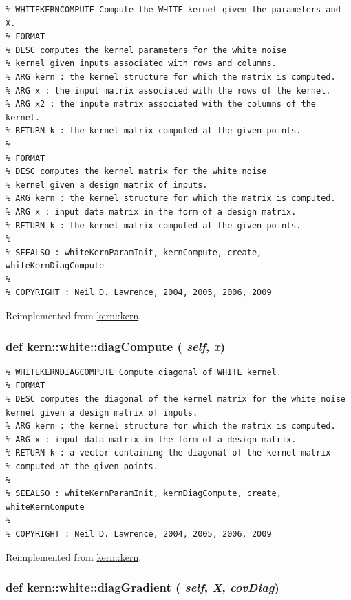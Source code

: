 \footnotesize\begin{verbatim}% WHITEKERNCOMPUTE Compute the WHITE kernel given the parameters and X.
% FORMAT
% DESC computes the kernel parameters for the white noise
% kernel given inputs associated with rows and columns.
% ARG kern : the kernel structure for which the matrix is computed.
% ARG x : the input matrix associated with the rows of the kernel.
% ARG x2 : the inpute matrix associated with the columns of the kernel.
% RETURN k : the kernel matrix computed at the given points.
%
% FORMAT
% DESC computes the kernel matrix for the white noise
% kernel given a design matrix of inputs.
% ARG kern : the kernel structure for which the matrix is computed.
% ARG x : input data matrix in the form of a design matrix.
% RETURN k : the kernel matrix computed at the given points.
%
% SEEALSO : whiteKernParamInit, kernCompute, create, whiteKernDiagCompute
%
% COPYRIGHT : Neil D. Lawrence, 2004, 2005, 2006, 2009

\end{verbatim}
\normalsize
 

Reimplemented from \hyperlink{classkern_1_1kern}{kern::kern}.\hypertarget{classkern_1_1white_952f70cef3c05231022b3221d10d23ed}{
\subsubsection[{diagCompute}]{\setlength{\rightskip}{0pt plus 5cm}def kern::white::diagCompute ( {\em self}, \/   {\em x})}}
\label{classkern_1_1white_952f70cef3c05231022b3221d10d23ed}




\footnotesize\begin{verbatim}% WHITEKERNDIAGCOMPUTE Compute diagonal of WHITE kernel.
% FORMAT
% DESC computes the diagonal of the kernel matrix for the white noise kernel given a design matrix of inputs.
% ARG kern : the kernel structure for which the matrix is computed.
% ARG x : input data matrix in the form of a design matrix.
% RETURN k : a vector containing the diagonal of the kernel matrix
% computed at the given points.
%
% SEEALSO : whiteKernParamInit, kernDiagCompute, create, whiteKernCompute
%
% COPYRIGHT : Neil D. Lawrence, 2004, 2005, 2006, 2009

\end{verbatim}
\normalsize
 

Reimplemented from \hyperlink{classkern_1_1kern}{kern::kern}.\hypertarget{classkern_1_1white_3a2f74e8f49816b15e75b067e312f7dc}{
\subsubsection[{diagGradient}]{\setlength{\rightskip}{0pt plus 5cm}def kern::white::diagGradient ( {\em self}, \/   {\em X}, \/   {\em covDiag})}}
\label{classkern_1_1white_3a2f74e8f49816b15e75b067e312f7dc}




